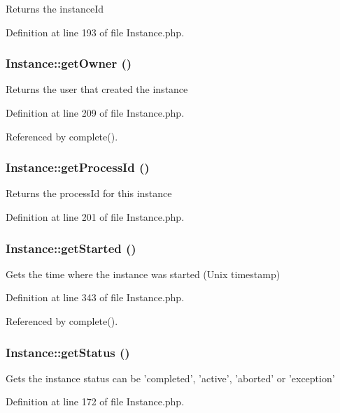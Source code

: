 Returns the instance\-Id 

Definition at line 193 of file Instance.php.
\subsubsection{\setlength{\rightskip}{0pt plus 5cm}Instance::get\-Owner ()}\label{classInstance_a11}


Returns the user that created the instance 

Definition at line 209 of file Instance.php.

Referenced by complete().
\subsubsection{\setlength{\rightskip}{0pt plus 5cm}Instance::get\-Process\-Id ()}\label{classInstance_a10}


Returns the process\-Id for this instance 

Definition at line 201 of file Instance.php.
\subsubsection{\setlength{\rightskip}{0pt plus 5cm}Instance::get\-Started ()}\label{classInstance_a20}


Gets the time where the instance was started (Unix timestamp) 

Definition at line 343 of file Instance.php.

Referenced by complete().
\subsubsection{\setlength{\rightskip}{0pt plus 5cm}Instance::get\-Status ()}\label{classInstance_a7}


Gets the instance status can be 'completed', 'active', 'aborted' or 'exception' 

Definition at line 172 of file Instance.php.
